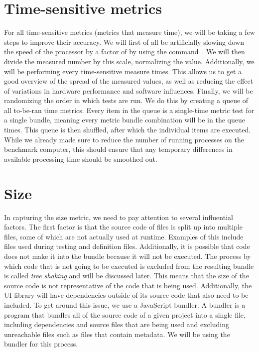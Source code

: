 \section{Time-sensitive metrics}\label{sec:experimental-setup:time-sensitive-metrics}
For all time-sensitive metrics (metrics that measure time), we will be taking a few steps to improve their accuracy. We will first of all be artificially slowing down the speed of the processor by a factor of \slowdownFactor{} by using the  command~. We will then divide the measured number by this scale, normalizing the value. Additionally, we will be performing every time-sensitive measure \numMeasures{} times. This allows us to get a good overview of the spread of the measured values, as well as reducing the effect of variations in hardware performance and software influences. Finally, we will be randomizing the order in which tests are run. We do this by creating a queue of all to-be-ran time metrics. Every item in the queue is a single-time metric test for a single bundle, meaning every metric bundle combination will be in the queue \numMeasures{} times. This queue is then shuffled, after which the individual items are executed. While we already made sure to reduce the number of running processes on the benchmark computer, this should ensure that any temporary differences in available processing time should be smoothed out.


\section{Size}\label{sec:experimental-setup:size}
In capturing the size metric, we need to pay attention to several influential factors. The first factor is that the source code of files is split up into multiple files, some of which are not actually used at runtime. Examples of this include files used during testing and definition files. Additionally, it is possible that code does not make it into the bundle because it will not be executed. The process by which code that is not going to be executed is excluded from the resulting bundle is called \emph{tree shaking} and will be discussed later. This means that the size of the source code is not representative of the code that is being used. Additionally, the UI library will have dependencies outside of its source code that also need to be included. To get around this issue, we use a JavaScript bundler. A bundler is a program that bundles all of the source code of a given project into a single file, including dependencies and source files that are being used and excluding unreachable files such as files that contain metadata. We will be using the  bundler for this process.

